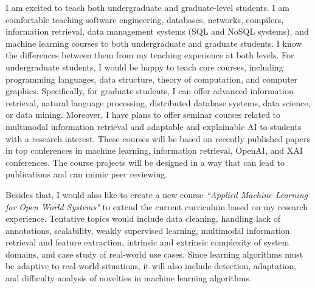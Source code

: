 I am excited to teach both undergraduate and graduate-level students. I am comfortable teaching software engineering, databases, networks, compilers, information retrieval, data management systems (SQL and NoSQL systems), and machine learning courses to both undergraduate and graduate students. I know the differences between them from my teaching experience at both levels.
For undergraduate students, I would be happy to teach core courses, including %
programming languages, data structure, theory of computation, and computer graphics. Specifically, for graduate students, I can offer advanced information retrieval, natural language processing, distributed database systems, data science, or data mining.
%
Moreover, I have plans to offer seminar courses related to multimodal information retrieval and adaptable and explainable AI to students with a research interest. 
These courses will be based on recently published papers in top conferences in machine learning, information retrieval, OpenAI, and XAI conferences. The course projects will be designed in a way that can lead to publications and can mimic peer reviewing. 
%

Besides that, I would also like to create a new course \textit{``Applied Machine Learning for Open World Systems"} to extend the current curriculum based on my research experience. Tentative topics would include data cleaning, 
handling lack of annotations, scalability,
weakly supervised learning, multimodal information retrieval and feature extraction, intrinsic and extrinsic complexity of system domains, and case study of real-world use cases. Since learning algorithms must be adaptive to real-world situations, it will also include detection, adaptation, and difficulty analysis of novelties in machine learning algorithms.